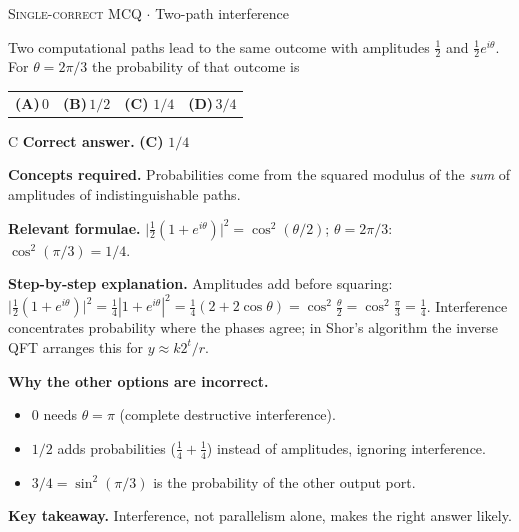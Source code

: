 \documentclass[11pt,a4paper]{article}
\newcommand{\optlabel}[1]{\textbf{(#1)}}
\newcommand{\correctlabel}[1]{\textcolor{okgreen}{\textbf{(#1)}\,\ding{51}}}
\newenvironment{qitem}[1]{\begin{list}{}{\setlength{\leftmargin}{3.3em}\setlength{\labelwidth}{3.1em}%
  \setlength{\labelsep}{0.2em}\setlength{\topsep}{3pt}\setlength{\parsep}{3pt}}\item[\textbf{Q.#1}\hfill]}{\end{list}}
\newcommand{\qsep}{\par\vspace{2pt}{\color{black!15}\hrule}\vspace{4pt}}
\newcommand{\qmeta}[2]{{\footnotesize\color{black!60}\textsc{#1} \;$\cdot$\; #2}\par}
\begin{document}
\begin{qitem}{29}
\qmeta{Single-correct MCQ}{Two-path interference}
Two computational paths lead to the same outcome with amplitudes $\frac12$ and $\frac12e^{i\theta}$. For $\theta = 2\pi/3$ the probability of that outcome is
\par\smallskip\noindent\begin{tabularx}{\linewidth}{@{}*{4}{L}@{}}
\optlabel{A}\,$0$ & \optlabel{B}\,$1/2$ & \correctlabel{C}\,$1/4$ & \optlabel{D}\,$3/4$
\end{tabularx}
\end{qitem}
\begin{solbox}{C}
\textbf{\color{brand}Correct answer.} \textcolor{okgreen}{\textbf{(C)}} $1/4$

\textbf{\color{brand}Concepts required.} Probabilities come from the squared modulus of the \emph{sum} of amplitudes of indistinguishable paths.

\textbf{\color{brand}Relevant formulae.} $\big|\frac12(1 + e^{i\theta})\big|^2 = \cos^2(\theta/2)$; $\theta = 2\pi/3$: $\cos^2(\pi/3) = 1/4$.

\textbf{\color{brand}Step-by-step explanation.} Amplitudes add before squaring: $\big|\frac12(1 + e^{i\theta})\big|^2 = \frac14|1 + e^{i\theta}|^2 = \frac14(2 + 2\cos\theta) = \cos^2\frac\theta2 = \cos^2\frac\pi3 = \frac14$.
Interference concentrates probability where the phases agree; in Shor's algorithm the inverse QFT arranges this for $y \approx k2^t/r$.

\textbf{\color{brand}Why the other options are incorrect.}
\begin{itemize}[leftmargin=2.4em, itemsep=1pt, topsep=2pt]
\item[\textbf{(A)}] $0$ needs $\theta = \pi$ (complete destructive interference).
\item[\textbf{(B)}] $1/2$ adds probabilities ($\frac14 + \frac14$) instead of amplitudes, ignoring interference.
\item[\textbf{(D)}] $3/4 = \sin^2(\pi/3)$ is the probability of the other output port.
\end{itemize}
\textbf{\color{brand}Key takeaway.} Interference, not parallelism alone, makes the right answer likely.
\end{solbox}
\qsep
\end{document}
